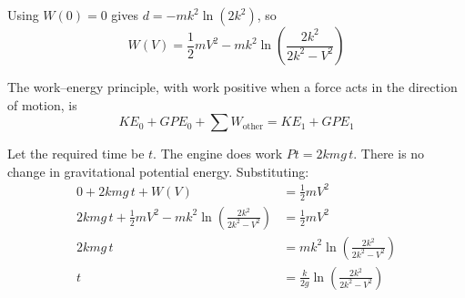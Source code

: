 \documentclass[leqno]{article}
\begin{document}
\begin{enumerate}[
  label=\textbf{\arabic*.},
  leftmargin=*,
  topsep=0pt,
  partopsep=0pt,
  parsep=0pt
]
\begin{djsSolution}
\begin{enumerate}[label=\textbf{(\alph*)}, start=1]
Using \(W(0)=0\) gives \(d=-mk^2\ln(2k^2)\), so
\[
W(V)=\frac12mV^2-mk^2\ln\left(\frac{2k^2}{2k^2-V^2}\right)
\]

The work--energy principle, with work positive when a force acts in the direction of motion, is
\[
KE_0+GPE_0+\sum W_{\text{other}}=KE_1+GPE_1
\]

Let the required time be \(t\). The engine does work \(Pt=2kmg\,t\). There is no change in gravitational potential energy. Substituting:
\begin{align*}
0+2kmg\,t+W(V)&=\frac12mV^2\\
2kmg\,t+\frac12mV^2-mk^2\ln\left(\frac{2k^2}{2k^2-V^2}\right)&=\frac12mV^2\\
2kmg\,t&=mk^2\ln\left(\frac{2k^2}{2k^2-V^2}\right)\\
t&=\frac{k}{2g}\ln\left(\frac{2k^2}{2k^2-V^2}\right)
\end{align*}
\end{enumerate}
\end{djsSolution}

\end{enumerate}
\end{document}

